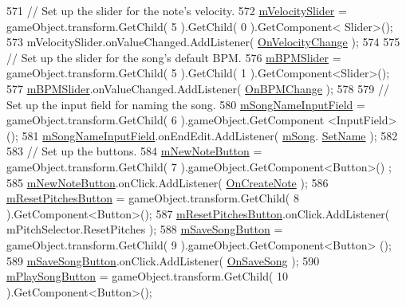 \begin{DoxyCode}
571         \textcolor{comment}{// Set up the slider for the note's velocity.}
572         \hyperlink{group___s_c_priv_var_ga0738678367556ebb69df6e73213f616d}{mVelocitySlider} = gameObject.transform.GetChild( 5 ).GetChild( 0 ).GetComponent<
      Slider>();
573         mVelocitySlider.onValueChanged.AddListener( \hyperlink{group___s_c_handlers_ga929912496540563f4ec02295a0d333c6}{OnVelocityChange} );
574 
575         \textcolor{comment}{// Set up the slider for the song's default BPM.}
576         \hyperlink{group___s_c_priv_var_ga6f751fe7fc31196eeec490cdbc679baa}{mBPMSlider} = gameObject.transform.GetChild( 5 ).GetChild( 1 ).GetComponent<Slider>();
577         \hyperlink{group___s_c_priv_var_ga6f751fe7fc31196eeec490cdbc679baa}{mBPMSlider}.onValueChanged.AddListener( \hyperlink{group___s_c_handlers_ga867d521ac1d7184636c40dad3ebd43b0}{OnBPMChange} );
578 
579         \textcolor{comment}{// Set up the input field for naming the song.        }
580         \hyperlink{group___s_c_priv_var_ga768474e1f768bfcce7010995020b09f3}{mSongNameInputField} = gameObject.transform.GetChild( 6 ).gameObject.GetComponent
      <InputField>();
581         \hyperlink{group___s_c_priv_var_ga768474e1f768bfcce7010995020b09f3}{mSongNameInputField}.onEndEdit.AddListener( \hyperlink{group___s_c_priv_var_ga9554e9b3758d1cc1e841a5f7d8aa9f56}{mSong}.
      \hyperlink{group___song_const_gacb01510cf72657fc7c64bb6ba00c2c56}{SetName} );
582 
583         \textcolor{comment}{// Set up the buttons.}
584         \hyperlink{group___s_c_priv_var_ga488ce0727c77abe7c84989241f4e55b4}{mNewNoteButton} = gameObject.transform.GetChild( 7 ).gameObject.GetComponent<Button>()
      ;
585         \hyperlink{group___s_c_priv_var_ga488ce0727c77abe7c84989241f4e55b4}{mNewNoteButton}.onClick.AddListener( \hyperlink{group___s_c_handlers_ga70f2fdac755a6b62f48afd96f2446d71}{OnCreateNote} );
586         \hyperlink{group___s_c_priv_var_ga89e82b9c8af6b34d7e0ec37c81f2f674}{mResetPitchesButton} = gameObject.transform.GetChild( 8 ).GetComponent<Button>();
587         \hyperlink{group___s_c_priv_var_ga89e82b9c8af6b34d7e0ec37c81f2f674}{mResetPitchesButton}.onClick.AddListener( mPitchSelector.ResetPitches );
588         \hyperlink{group___s_c_priv_var_ga8bcdbe4c52da2e90edf9afffb35b48d3}{mSaveSongButton} = gameObject.transform.GetChild( 9 ).gameObject.GetComponent<Button>
      ();
589         \hyperlink{group___s_c_priv_var_ga8bcdbe4c52da2e90edf9afffb35b48d3}{mSaveSongButton}.onClick.AddListener( \hyperlink{group___s_c_handlers_ga3fac289dfb9e67d94afbeb0dfdb22f48}{OnSaveSong} );
590         \hyperlink{group___s_c_priv_var_ga8afebf9e2e92619f9ef9cfe5410a143a}{mPlaySongButton} = gameObject.transform.GetChild( 10 ).GetComponent<Button>();

\end{DoxyCode}
